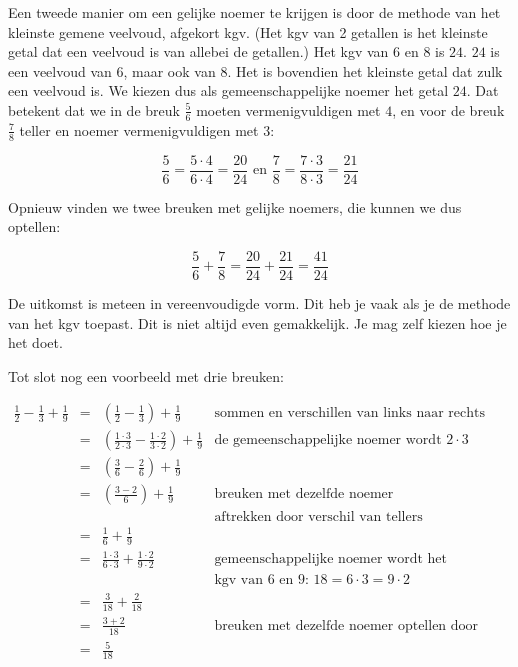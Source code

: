 Een tweede manier om een gelijke noemer te krijgen is door de methode van het kleinste gemene veelvoud, afgekort kgv. (Het kgv van 2 getallen is het kleinste getal dat een veelvoud is van allebei de getallen.) Het kgv van $6$ en $8$ is $24$. $24$ is een veelvoud van $6$, maar ook van $8$. Het is bovendien het kleinste getal dat zulk een veelvoud is. We kiezen dus als gemeenschappelijke noemer het getal $24$. Dat betekent dat we in de breuk $\frac{5}{6}$ moeten vermenigvuldigen met $4$, en voor de breuk $\frac{7}{8}$ teller en noemer vermenigvuldigen met $3$:

\begin{equation*}
\frac{5}{6} = \frac{5 \cdot 4}{6 \cdot 4}=\frac{20}{24} \text{ en } \frac{7}{8}=\frac{7 \cdot 3}{8 \cdot 3}=\frac{21}{24}
\end{equation*}


Opnieuw vinden we twee breuken met gelijke noemers, die kunnen we dus optellen:

\begin{equation*}
\frac{5}{6}+\frac{7}{8}=\frac{20}{24}+\frac{21}{24}=\frac{41}{24}
\end{equation*}

De uitkomst is meteen in vereenvoudigde vorm. Dit heb je vaak als je de methode van het kgv toepast. Dit is niet altijd even gemakkelijk. Je mag zelf kiezen hoe je het doet.

Tot slot nog een voorbeeld met drie breuken:

\begin{equation*}
\begin{array}{cclr}
\frac{1}{2}-\frac{1}{3}+\frac{1}{9} &=& (\frac{1}{2}-\frac{1}{3})+\frac{1}{9} & \text{sommen en verschillen van links naar rechts} \\
&=& (\frac{1 \cdot 3}{2 \cdot 3}-\frac{1\cdot 2}{3 \cdot 2})+\frac{1}{9} & \text{de gemeenschappelijke noemer wordt $2 \cdot 3$} \\
&=& (\frac{3}{6}-\frac{2}{6})+\frac{1}{9} &  \\
&=& (\frac{3-2}{6})+\frac{1}{9} &  \text{breuken met dezelfde noemer} \\
& & & \text{aftrekken door verschil van tellers}  \\
&=& \frac{1}{6}+\frac{1}{9} &   \\
&=& \frac{1\cdot 3}{6\cdot 3}+\frac{1\cdot 2}{9\cdot 2} & \text{gemeenschappelijke noemer wordt het} \\
& & & \text{kgv van $6$ en $9$: $18=6 \cdot 3 = 9 \cdot 2$} \\
&=& \frac{3}{18}+\frac{2}{18} &   \\
&=& \frac{3+2}{18} & \text{breuken met dezelfde noemer optellen door som van tellers}\\
&=& \frac{5}{18}
\end{array}
\end{equation*}

